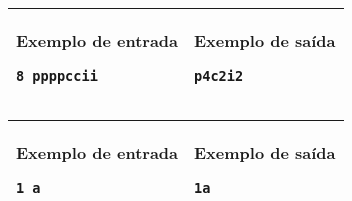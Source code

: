 \begin{table}[!h]
\centering
\begin{tabular}{|l|l|}
\hline
\begin{minipage}[t]{3in}
\textbf{Exemplo de entrada}
\begin{verbatim}
8 ppppccii
\end{verbatim}
\vspace{1mm}
\end{minipage}
&
\begin{minipage}[t]{3in}
\textbf{Exemplo de saída}
\begin{verbatim}
p4c2i2
\end{verbatim}
\vspace{1mm}
\end{minipage} \\
\hline
\end{tabular}
\end{table}

\begin{table}[!h]
\centering
\begin{tabular}{|l|l|}
\hline
\begin{minipage}[t]{3in}
\textbf{Exemplo de entrada}
\begin{verbatim}
1 a
\end{verbatim}
\vspace{1mm}
\end{minipage}
&
\begin{minipage}[t]{3in}
\textbf{Exemplo de saída}
\begin{verbatim}
1a
\end{verbatim}
\vspace{1mm}
\end{minipage} \\
\hline
\end{tabular}
\end{table}

